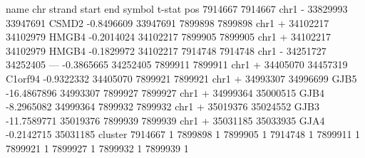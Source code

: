 \begin{Schunk}
\begin{Soutput}
           name  chr strand    start      end  symbol      t-stat      pos
7914667 7914667 chr1      - 33829993 33947691   CSMD2  -0.8496609 33947691
7899898 7899898 chr1      + 34102217 34102979   HMGB4  -0.2014024 34102217
7899905 7899905 chr1      + 34102217 34102979   HMGB4  -0.1829972 34102217
7914748 7914748 chr1      - 34251727 34252405     ---  -0.3865665 34252405
7899911 7899911 chr1      + 34405070 34457319 C1orf94  -0.9322332 34405070
7899921 7899921 chr1      + 34993307 34996699    GJB5 -16.4867896 34993307
7899927 7899927 chr1      + 34999364 35000515    GJB4  -8.2965082 34999364
7899932 7899932 chr1      + 35019376 35024552    GJB3 -11.7589771 35019376
7899939 7899939 chr1      + 35031185 35033935    GJA4  -0.2142715 35031185
        cluster
7914667       1
7899898       1
7899905       1
7914748       1
7899911       1
7899921       1
7899927       1
7899932       1
7899939       1
\end{Soutput}
\end{Schunk}
